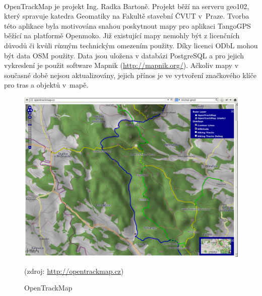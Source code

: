 \documentclass[11pt,a4paper,titlepage,oneside]{book}
\begin{document}
                

		\paragraph{} OpenTrackMap je projekt Ing. Radka Bartoně. Projekt běží na serveru geo102, který spravuje katedra Geomatiky na Fakultě stavební ČVUT v~Praze. Tvorba této aplikace byla motivována snahou poskytnout mapy pro aplikaci TangoGPS běžící na platformě Openmoko\cite{OTM}. Již existující mapy nemohly být z licenčních důvodů či kvůli různým technickým omezením použity. Díky licenci \ac{ODbL} mohou být data \ac{OSM} použity. Data jsou uložena v databázi PostgreSQL a pro jejich vykreslení je použit software Mapnik (\url{http://mapnik.org/}). Ačkoliv mapy v současné době nejsou aktualizovány, jejich přínos je ve vytvoření značkového klíče pro tras a objektů v~mapě\cite{otm_klic}. 

		\begin{figure}[!h]
			\begin{center}
				\includegraphics[width=12cm]{obrazky/otm.png}
				\caption{OpenTrackMap}
				(zdroj: \url{http://opentrackmap.cz})
			\end{center}
		\end{figure}

\end{document}
